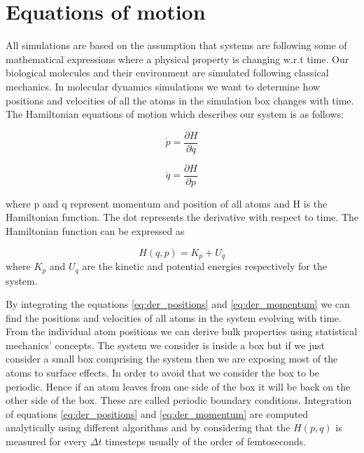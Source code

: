\section{Equations of motion}
All simulations are based on the assumption that
systems are following some of mathematical expressions where
a physical property is changing w.r.t time.
Our biological molecules and their environment are simulated 
following classical mechanics.\cite{Lin2016}
In molecular dynamics simulations we want to determine how positions
and velocities of all the atoms in the simulation box changes with time.
The Hamiltonian equations of motion which describes our system is as follows:

\begin{equation}
\label{eq:der_momentum}
\dot p = \frac{\partial H}{\partial q}
\end{equation}

\begin{equation}
\label{eq:der_positions}
\dot q = \frac{\partial H}{\partial p}
\end{equation}

where p and q represent momentum and position of all atoms and H is the Hamiltonian function. The dot
represents the derivative with respect to time.\cite{Lin2016}
The Hamiltonian function can be expressed as

\begin{equation}
    H(q,p) =  K_{p} + U_{q}
\end{equation}{}
where $K_p$ and $U_q$ are the kinetic and potential energies respectively for the system.
 
By integrating the equations \ref{eq:der_positions} and \ref{eq:der_momentum} 
we can find the positions and velocities of all atoms in the system evolving with time. 
From the individual atom positions we can derive bulk properties using statistical mechanics' concepts.
The system we consider is inside a box but if we just consider a small box comprising the system then we 
are exposing most of the atoms to surface effects. In order to avoid that
we consider the box to be periodic. Hence if an atom leaves from one side of the box it will be back on the other side of the box. These are called periodic boundary conditions.
Integration of equations  \ref{eq:der_positions} and \ref{eq:der_momentum}  are computed analytically using different algorithms and by considering that the $H(p,q)$ is measured for every $\Delta t$ timesteps usually of the order of femtoseconds.\cite{Lin2016}



